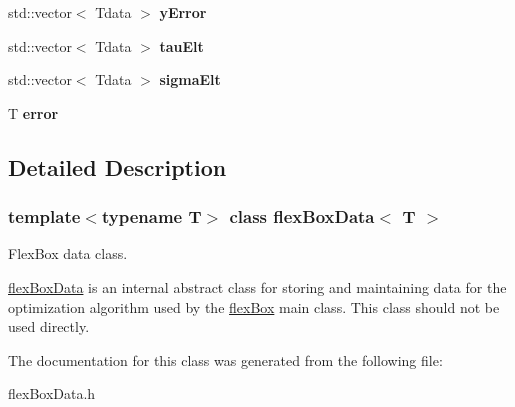 \begin{DoxyCompactItemize}
std\+::vector$<$ Tdata $>$ {\bfseries y\+Error}
\item 
\mbox{\label{classflex_box_data_a68cb4de5ab5e201bbe0c43a094af764a}} 
std\+::vector$<$ Tdata $>$ {\bfseries tau\+Elt}
\item 
\mbox{\label{classflex_box_data_ac258596d869c402b3b5e0b658d5d8016}} 
std\+::vector$<$ Tdata $>$ {\bfseries sigma\+Elt}
\item 
\mbox{\label{classflex_box_data_a374d68604d52bbf0a1ef88579710d884}} 
T {\bfseries error}
\end{DoxyCompactItemize}


\subsection{Detailed Description}
\subsubsection*{template$<$typename T$>$\newline
class flex\+Box\+Data$<$ T $>$}

Flex\+Box data class. 

\hyperlink{classflex_box_data}{flex\+Box\+Data} is an internal abstract class for storing and maintaining data for the optimization algorithm used by the \hyperlink{classflex_box}{flex\+Box} main class. This class should not be used directly. 

The documentation for this class was generated from the following file\+:\begin{DoxyCompactItemize}
\item 
flex\+Box\+Data.\+h\end{DoxyCompactItemize}

